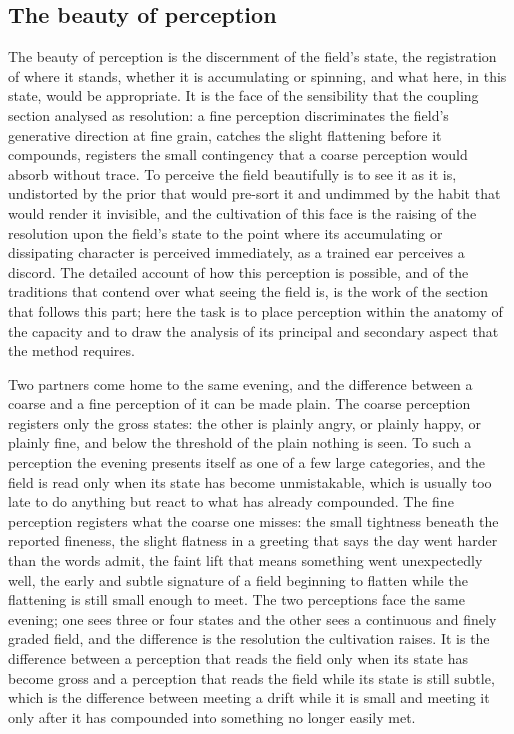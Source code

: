 \subsection{The beauty of perception}
\label{p22:sub:beauty-perception}

The beauty of perception is the discernment of the field's state, the registration of where it stands, whether it is accumulating or spinning, and what here, in this state, would be appropriate. It is the face of the sensibility that the coupling section analysed as resolution: a fine perception discriminates the field's generative direction at fine grain, catches the slight flattening before it compounds, registers the small contingency that a coarse perception would absorb without trace. To perceive the field beautifully is to see it as it is, undistorted by the prior that would pre-sort it and undimmed by the habit that would render it invisible, and the cultivation of this face is the raising of the resolution upon the field's state to the point where its accumulating or dissipating character is perceived immediately, as a trained ear perceives a discord. The detailed account of how this perception is possible, and of the traditions that contend over what seeing the field is, is the work of the section that follows this part; here the task is to place perception within the anatomy of the capacity and to draw the analysis of its principal and secondary aspect that the method requires.

\begin{casebox}
Two partners come home to the same evening, and the difference between a coarse and a fine perception of it can be made plain. The coarse perception registers only the gross states: the other is plainly angry, or plainly happy, or plainly fine, and below the threshold of the plain nothing is seen. To such a perception the evening presents itself as one of a few large categories, and the field is read only when its state has become unmistakable, which is usually too late to do anything but react to what has already compounded. The fine perception registers what the coarse one misses: the small tightness beneath the reported fineness, the slight flatness in a greeting that says the day went harder than the words admit, the faint lift that means something went unexpectedly well, the early and subtle signature of a field beginning to flatten while the flattening is still small enough to meet. The two perceptions face the same evening; one sees three or four states and the other sees a continuous and finely graded field, and the difference is the resolution the cultivation raises. It is the difference between a perception that reads the field only when its state has become gross and a perception that reads the field while its state is still subtle, which is the difference between meeting a drift while it is small and meeting it only after it has compounded into something no longer easily met.
\end{casebox}

